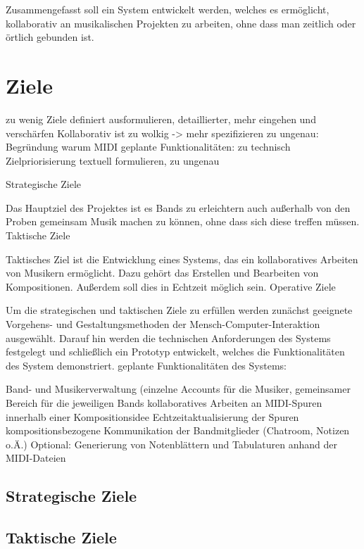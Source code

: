 \documentclass[12pt]{scrartcl}
\begin{document}
Zusammengefasst soll ein System entwickelt werden, welches es ermöglicht, kollaborativ an musikalischen Projekten zu arbeiten, ohne dass man zeitlich oder örtlich gebunden ist.


\section{Ziele}

zu wenig Ziele definiert
ausformulieren, detaillierter, mehr eingehen und verschärfen
Kollaborativ ist zu wolkig -> mehr spezifizieren
zu ungenau: Begründung warum MIDI
geplante Funktionalitäten: zu technisch
Zielpriorisierung textuell formulieren, zu ungenau

Strategische Ziele

Das Hauptziel des Projektes ist es Bands zu erleichtern auch außerhalb von den Proben gemeinsam Musik machen zu können, ohne dass sich diese treffen müssen.
Taktische Ziele

Taktisches Ziel ist die Entwicklung eines Systems, das ein kollaboratives Arbeiten von Musikern ermöglicht. Dazu gehört das Erstellen und Bearbeiten von Kompositionen. Außerdem soll dies in Echtzeit möglich sein.
Operative Ziele

Um die strategischen und taktischen Ziele zu erfüllen werden zunächst geeignete Vorgehens- und Gestaltungsmethoden der Mensch-Computer-Interaktion ausgewählt. Darauf hin werden die technischen Anforderungen des Systems festgelegt und schließlich ein Prototyp entwickelt, welches die Funktionalitäten des System demonstriert.
geplante Funktionalitäten des Systems:

Band- und Musikerverwaltung (einzelne Accounts für die Musiker, gemeinsamer Bereich für die jeweiligen Bands
kollaboratives Arbeiten an MIDI-Spuren innerhalb einer Kompositionsidee
Echtzeitaktualisierung der Spuren
kompositionsbezogene Kommunikation der Bandmitglieder (Chatroom, Notizen o.Ä.)
Optional: Generierung von Notenblättern und Tabulaturen anhand der MIDI-Dateien



\subsection{Strategische Ziele}

\subsection{Taktische Ziele}
\end{document}

